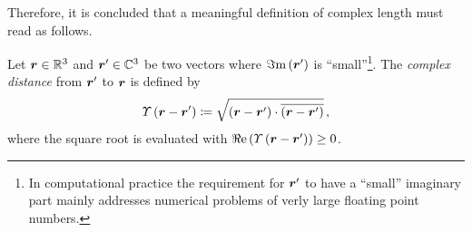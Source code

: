 Therefore, it is concluded that a meaningful definition of complex length must
read as follows.
\begin{definition}\label{def:cmplx_distance}
	Let $\robs \in \R^3$ and $\rsrc \in \C^3$ be two vectors where
	$\imag{\rsrc}$ is \enquote{small}\footnote{In computational practice the
	requirement for $\rsrc$ to have a \enquote{small} imaginary part mainly
	addresses numerical problems of verly large floating point numbers.}.
	The \emph{complex distance} from $\rsrc$ to $\robs$ is defined by
	\begin{equation}\label{eq:def:cmplx_distance}
		\cmplxlength{\rdiff} 
		\coloneqq
		\sqrt{\left(\rdiff\right) \cdot \overline{\left(\rdiff\right)}}
		\, ,
	\end{equation}
	where the square root is evaluated with
	$\real{\cmplxlength{\rdiff}} \geq 0$.
\end{definition}

